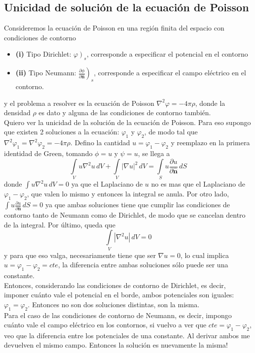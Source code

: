 \subsection{Unicidad de solución de la ecuación de Poisson}
Consideremos la ecuación de Poisson en una región finita del espacio con condiciones de contorno
\begin{itemize}
    \item \textbf{(i)} Tipo Dirichlet: $\left.\varphi\right)_{s}$, corresponde a especificar el potencial en el contorno
    \item \textbf{(ii)} Tipo Neumann:
    $\left.\frac{\partial \phi}{\partial \hat{\textbf{n}}}\right)_{s}$, corresponde a especificar el campo eléctrico en el contorno.
\end{itemize}
y el problema a resolver es la ecuación de Poisson $\nabla^{2}\varphi = -4\pi \rho$, donde la densidad $\rho$ es dato y alguna de las condiciones de contorno también.\\
\indent Quiero ver la unicidad de la solución de la ecuación de Poisson. Para eso supongo que existen 2 soluciones a la ecuación: $\varphi_{1}$ y $\varphi_{2}$, de modo tal que $\nabla^{2}\varphi_{1} = \nabla^{2}\varphi_{2} = -4\pi \rho$. Defino la cantidad $u = \varphi_{1} - \varphi_{2}$ y reemplazo en la primera identidad de Green, tomando $\phi = u$ y $\psi = u$, se llega a 
\begin{equation*}
    \int\limits_{V} u\nabla^{2}u\,dV
    +\int\limits_{V}|\nabla u |^{2}\,dV
    = \int\limits_{S} u\frac{\partial u}{\partial \hat{\textbf{n}}}\,dS
\end{equation*}
donde $\int u\nabla^{2}u\,dV = 0$ ya que el Laplaciano de $u$ no es mas que el Laplaciano de $\varphi_{1} - \varphi_{2}$, que valen lo mismo y entonces la integral se anula. Por otro lado, $\int u \frac{\partial u}{\partial \hat{\textbf{n}}}\,dS = 0$ ya que ambas soluciones tiene que cumplir las condiciones de contorno tanto de Neumann como de Dirichlet, de modo que se cancelan dentro de la integral. Por último, queda que
\begin{equation*}
    \int\limits_{V}|\nabla^{2}u|\,dV = 0
\end{equation*}
y para que eso valga, necesariamente tiene que ser $\nabla u = 0$, lo cual implica $u = \varphi_{1}-\varphi_{2} = cte$, la diferencia entre ambas soluciones sólo puede ser una constante.\\
\indent Entonces, considerando las condiciones de contorno de Dirichlet, es decir, imponer cuánto vale el potencial en el borde, ambos potenciales son iguales: $\varphi_{1} = \varphi_{2}$. Entonces no son dos soluciones distintas, son la misma.\\
\indent Para el caso de las condiciones de contorno de Neumann, es decir, impongo cuánto vale el campo eléctrico en los contornos, si vuelvo a ver que $cte = \varphi_{1} - \varphi_{2}$, veo que la diferencia entre los potenciales de una constante. Al derivar ambos me devuelven el mismo campo. Entonces la solución es nuevamente la misma!


